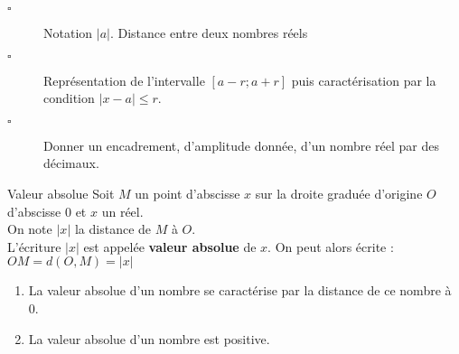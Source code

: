 \begin{titre}

\end{titre}


\begin{CpsCol}
\begin{description}
\item[$\square$] Notation $\vert a\vert$. Distance entre deux nombres réels
\item[$\square$] Représentation de l'intervalle $[a-r;a+r]$ puis caractérisation par la condition $\vert x-	a\vert \leq r$.
\item[$\square$] Donner un encadrement, d’amplitude donnée, d’un nombre réel par des décimaux.
\end{description}
\end{CpsCol}



\begin{DefT}{Valeur absolue}
Soit $M$ un point d'abscisse $x$ sur la droite graduée d'origine $O$ d'abscisse 0 et $x$ un réel.\\
On note $\vert x \vert$ la distance de $M$ à $O$.\\
L'écriture $\vert x\vert$ est appelée \textbf{valeur absolue} de $x$. On peut alors écrite : $OM = d(O,M)=\vert x\vert$
\end{DefT}


\vspace{0.4cm}

\begin{Rq}
\begin{enumerate}
\item La valeur absolue d'un nombre se caractérise par la distance de ce nombre à 0.
\item La valeur absolue d'un nombre est positive.
\end{enumerate}
\end{Rq}


